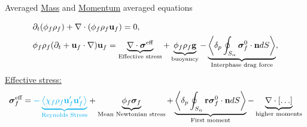 \documentclass{sintefbeamer}
\begin{document}
\section*{}


\begin{frame}{Averaged \underline{Mass} and \underline{Momentum} averaged equations }

  \begin{align*}
    &\partial_t (\phi_f \rho_f)  
    + \mathbf{\nabla}\cdot (
        \phi_f \rho_f\textbf{u}_f
    )
    = 
    0,\\
    &
    \phi_f \rho_f (\partial_t + \textbf{u}_f\cdot \mathbf{\nabla})\textbf{u}_f
    = 
    \underbrace{\mathbf{\nabla}\cdot \bm\sigma^\text{eff}}_\text{Effective stress}
    + \underbrace{\phi_f \rho_f \textbf{g} }_\text{buoyancy}
    - \underbrace{\left<\delta_p \oint_{S_{\alpha}} {\bm{\sigma}_f^0 \cdot \textbf{n}} dS\right>}_\text{Interphase drag force},
  \end{align*}
  \underline{Effective stress: } 
  \begin{equation*}
    \bm{\sigma}_f^\text{eff}
    =
    \textcolor{cyan}{- \underbrace{\avg{\chi_f\rho_f\textbf{u}_f'\textbf{u}_f'}}_\text{Reynolds Stress}}
    + \underbrace{\phi_f \bm{\sigma}_f}_\text{Mean Newtonian stress}%
     + \underbrace{ {\pSavg{{\textbf{r}\bm{\sigma}_f^0 \cdot \textbf{n}}}}}_\text{First moment}
     -\underbrace{\div [\ldots]}_\text{higher moments}
  \end{equation*}
\end{frame}
\end{document}

